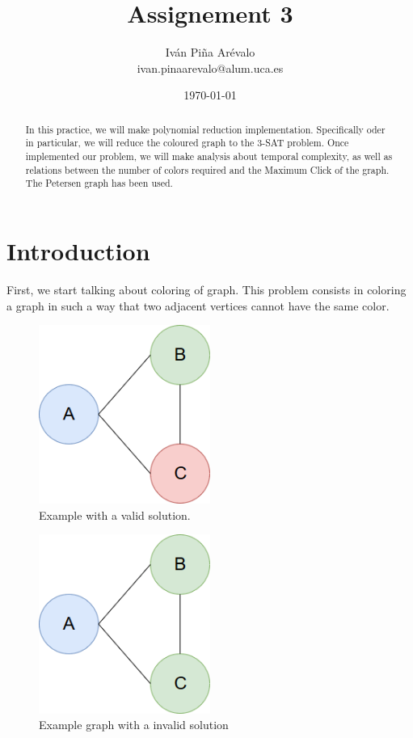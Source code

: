 \documentclass{article}
\title{Assignement 3}
\author{Iván Piña Arévalo \\ ivan.pinaarevalo@alum.uca.es}
\date{\today}
\begin{document}
\maketitle

\newpage
\begin{abstract}
    In this practice, we will make polynomial reduction implementation. Specifically oder in particular,
    we will reduce the coloured graph to the 3-SAT problem. Once implemented our problem, we will make 
    analysis about  temporal complexity, as well as relations between the number of colors required and the 
    Maximum Click of the graph. The Petersen graph has been used.  
\end{abstract}

\newpage

\section{Introduction}
First, we start talking about coloring of graph. This problem consists in coloring a graph in such a way 
that two adjacent vertices cannot have the same color.
    \begin{figure}[H]
        \centering
        \includegraphics[width=0.5\textwidth]{pictures/ejemplo.png}
        \caption{Example with a valid solution.}
    \end{figure}
	
    \begin{figure}[H]
        \centering
        \includegraphics[width=0.5\textwidth]{pictures/ejemplobad.png}
        \caption{Example graph with a invalid solution}
    \end{figure}
\end{document}
